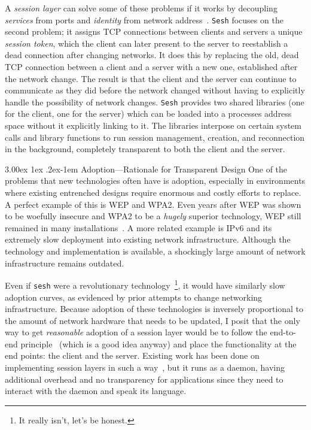 \documentclass[twocolumn,11pt]{article}
\makeatletter
\newcommand{\sesh}{\texttt{sesh}\xspace}
\newcommand{\Sesh}{\texttt{Sesh}\xspace}
\renewcommand{\paragraph}{%
  \@startsection{paragraph}{4}%
  {\z@}{3.00ex \@plus 1ex \@minus .2ex}{-1em}%
  {\normalfont\normalsize\bfseries}%
}
\makeatother
\begin{document}
A \textit{session layer} can solve some of these problems if it works by
decoupling \textit{services} from ports and \textit{identity} from network
address~\cite{wasptr-15-01,chandrashekar2003service}.
\Sesh focuses on the second problem; it assigns TCP connections between
clients and servers a unique \textit{session token}, which the client can later
present to the server to reestablish a dead connection after changing networks.
It does this by replacing the old, dead TCP connection between a client and a
server with a new one, established after the network change. The result is that
the client and the server can continue to communicate as they did before the
network changed without having to explicitly handle the possibility of network
changes. \Sesh provides two shared libraries (one for the client, one for the
server) which can be loaded into a processes address space without it
explicitly linking to it. The libraries interpose on certain system calls and
library functions to run session management, creation, and reconnection in the
background, completely transparent to both the client and the server.

\paragraph{Adoption---Rationale for Transparent Design}
One of the problems that new technologies often have is adoption, especially in environments
where existing entrenched designs require enormous and costly efforts to
replace. A perfect example of this is WEP and WPA2. Even years after WEP was
shown to be woefully insecure and WPA2 to be a \textit{hugely} superior
technology, WEP still remained in many installations~\cite{bittau2006sp}. A more
related example is IPv6 and its extremely slow deployment into existing network
infrastructure. Although the technology and implementation is available, a
shockingly large amount of network infrastructure remains outdated.

Even if \sesh were a revolutionary technology~\footnote{It really isn't, let's
be honest.}, it would have similarly slow adoption curves, as evidenced by prior
attempts to change networking infrastructure. Because adoption of these
technologies is inversely proportional to the amount of network hardware that
needs to be updated, I posit that the only way to get \textit{reasonable}
adoption of a session layer would be to follow the end-to-end
principle~\cite{Saltzer} (which is a good idea anyway) and place the
functionality at the end points: the client and the server. Existing work has
been done on implementing session layers in such a way~\cite{wasptr-15-01}, but
it runs as a daemon, having additional overhead and no transparency for
applications since they need to interact with the daemon and speak its language.
\end{document}
